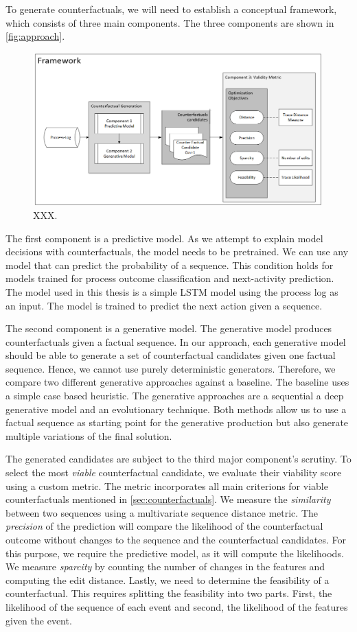 \documentclass[./../../paper.tex]{subfiles}
\begin{document}
To generate counterfactuals, we will need to establish a conceptual framework, which consists of three main components. The three components are shown in \autoref{fig:approach}. 
\begin{figure}[htb]
    \centering
    \includegraphics[width=0.99\textwidth]{figures/framework.png}
    \caption{XXX.}
    \label{fig:approach}
\end{figure}

The first component is a predictive model. As we attempt to explain model decisions with counterfactuals, the model needs to be pretrained. We can use any model that can predict the probability of a sequence. This condition holds for models trained for process outcome classification and next-activity prediction. The model used in this thesis is a simple LSTM model using the process log as an input. The model is trained to predict the next action given a sequence. 

The second component is a generative model. The generative model produces counterfactuals given a factual sequence. In our approach, each generative model should be able to generate a set of counterfactual candidates given one factual sequence. Hence, we cannot use purely deterministic generators. Therefore, we compare two different generative approaches against a baseline. The baseline uses a simple case based heuristic. The  generative approaches are a sequential a deep generative model and an evolutionary technique. Both methods allow us to use a factual sequence as starting point for the generative production but also generate multiple variations of the final solution. 

The generated candidates are subject to the third major component's scrutiny. To select the most \emph{viable} counterfactual candidate, we evaluate their viability score using a custom metric. The metric incorporates all main criterions for viable counterfactuals mentioned in \autoref{sec:counterfactuals}. We measure the \emph{similarity} between two sequences using a multivariate sequence distance metric. The \emph{precision} of the prediction will compare the likelihood of the counterfactual outcome without changes to the sequence and the counterfactual candidates. For this purpose, we require the predictive model, as it will compute the likelihoods. We measure \emph{sparcity} by counting the number of changes in the features and computing the edit distance. Lastly, we need to determine the feasibility of a counterfactual. This requires splitting the feasibility into two parts. First, the likelihood of the sequence of each event and second, the likelihood of the features given the event.
\end{document}
